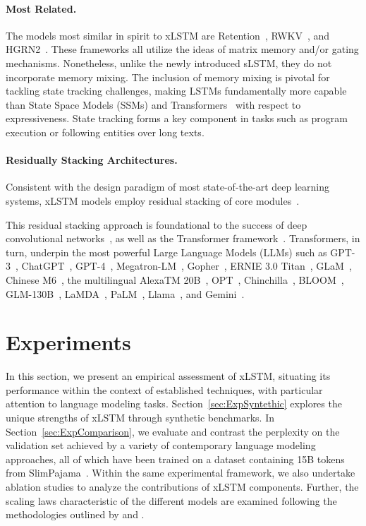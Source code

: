 \paragraph{Most Related.} The models most similar in spirit to xLSTM are Retention~\citep{Sun:23arxiv}, RWKV~\citep{Peng:23arxivshort,Peng:24arxivshort}, and HGRN2~\citep{Qin:24arxiv}. These frameworks all utilize the ideas of matrix memory and/or gating mechanisms. Nonetheless, unlike the newly introduced sLSTM, they do not incorporate memory mixing. The inclusion of memory mixing is pivotal for tackling state tracking challenges, making LSTMs fundamentally more capable than State Space Models (SSMs) and Transformers~\citep{Merrill:24,Deletang:23} with respect to expressiveness. State tracking forms a key component in tasks such as program execution or following entities over long texts.

\paragraph{Residually Stacking Architectures.} Consistent with the design paradigm of most state-of-the-art deep learning systems, xLSTM models employ residual stacking of core modules~\citep{Srivastava:15,He:16}.

This residual stacking approach is foundational to the success of deep convolutional networks~\citep{He:16}, as well as the Transformer framework~\citep{Vaswani:17}. Transformers, in turn, underpin the most powerful Large Language Models (LLMs) such as GPT-3~\citep{Brown:20short}, ChatGPT~\citep{Schulman:22short}, GPT-4~\citep{Achiam:23gpt4short}, Megatron-LM~\citep{Shoeybi:19}, Gopher~\citep{Rae:21short}, ERNIE 3.0 Titan~\citep{Wang:21arxivshort}, GLaM~\citep{Du:21glamshort}, Chinese M6~\citep{Lin:21}, the multilingual AlexaTM 20B~\citep{Soltan:22}, OPT~\citep{Zhang:22opt}, Chinchilla~\citep{Hoffmann:22short}, BLOOM~\citep{Scao:22arxivshort}, GLM-130B~\citep{Zeng:22arxivshort}, LaMDA~\citep{Thoppilan:22short}, PaLM~\citep{Chowdhery:22short}, Llama~\citep{Touvron:23arxiv}, and Gemini~\citep{GeminiTeam:23arxiv,Reid:24arxiv}.

\section{Experiments}
\label{sec:Exp}

In this section, we present an empirical assessment of xLSTM, situating its performance within the context of established techniques, with particular attention to language modeling tasks. Section~\ref{sec:ExpSyntethic} explores the unique strengths of xLSTM through synthetic benchmarks. In Section~\ref{sec:ExpComparison}, we evaluate and contrast the perplexity on the validation set achieved by a variety of contemporary language modeling approaches, all of which have been trained on a dataset containing 15B tokens from SlimPajama~\citep{Soboleva:23}. Within the same experimental framework, we also undertake ablation studies to analyze the contributions of xLSTM components. Further, the scaling laws characteristic of the different models are examined following the methodologies outlined by \citet{Kaplan:20} and \citet{Brown:20short}.

